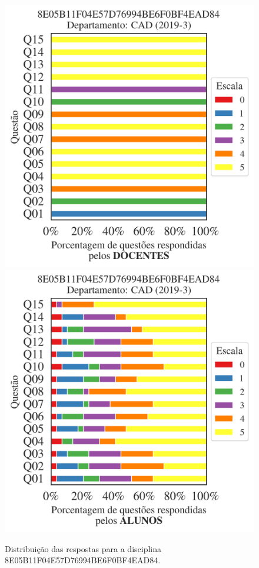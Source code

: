 \documentclass[a4paper,10pt]{article}
\begin{document}
\begin{figure}[h]
\centering
\includegraphics[width=0.485\linewidth]{analise_disciplina_departamento_CAD_8E05B11F04E57D76994BE6F0BF4EAD84_docentes.png}
\includegraphics[width=0.485\linewidth]{analise_disciplina_departamento_CAD_8E05B11F04E57D76994BE6F0BF4EAD84_alunos.png}
\caption{\label{fig:analise_geral_departamento}                Distribuição das respostas para a disciplina 8E05B11F04E57D76994BE6F0BF4EAD84. }
\end{figure}
\end{document}

